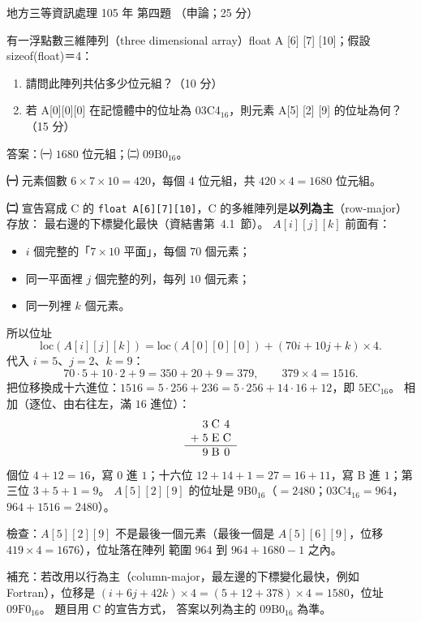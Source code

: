 \begin{pastexam}[label={px:df3-105-ds-04}]{地方三等資訊處理 105 年 第四題}
（申論；25 分）

有一浮點數三維陣列（three dimensional array）float A [6] [7] [10]；假設 sizeof(float)＝4：
\begin{enumerate}[leftmargin=2.6em, labelsep=0.4em]
\item[㈠] 請問此陣列共佔多少位元組？（10 分）
\item[㈡] 若 A[0][0][0] 在記憶體中的位址為 03C4$_{16}$，則元素 A[5] [2] [9] 的位址為何？（15 分）
\end{enumerate}
\end{pastexam}

\begin{pastsoln}
答案：㈠ $1680$ 位元組；㈡ $09\mathrm{B}0_{16}$。

\textbf{㈠} 元素個數 $6 \times 7 \times 10 = 420$，每個 $4$ 位元組，共 $420 \times 4 = 1680$ 位元組。

\textbf{㈡} 宣告寫成 C 的 \texttt{float A[6][7][10]}，C 的多維陣列是\textbf{以列為主}（row-major）存放：
最右邊的下標變化最快（資結書第~4.1~節）。 $A[i][j][k]$ 前面有：
\begin{itemize}
\item $i$ 個完整的「$7 \times 10$ 平面」，每個 $70$ 個元素；
\item 同一平面裡 $j$ 個完整的列，每列 $10$ 個元素；
\item 同一列裡 $k$ 個元素。
\end{itemize}
所以位址
\[
\mathrm{loc}(A[i][j][k]) = \mathrm{loc}(A[0][0][0]) + (70 i + 10 j + k) \times 4 .
\]
代入 $i = 5$、$j = 2$、$k = 9$：
\[
70 \cdot 5 + 10 \cdot 2 + 9 = 350 + 20 + 9 = 379, \qquad 379 \times 4 = 1516 .
\]
把位移換成十六進位：$1516 = 5 \cdot 256 + 236 = 5 \cdot 256 + 14 \cdot 16 + 12$，即 $5\mathrm{EC}_{16}$。
相加（逐位、由右往左，滿 $16$ 進位）：
\[
\begin{array}{r@{\;}c@{\;}c@{\;}c}
 & 3 & \mathrm{C} & 4 \\
+ & 5 & \mathrm{E} & \mathrm{C} \\
\hline
 & 9 & \mathrm{B} & 0
\end{array}
\]
個位 $4 + 12 = 16$，寫 $0$ 進 $1$；十六位 $12 + 14 + 1 = 27 = 16 + 11$，寫 B 進 $1$；第三位 $3 + 5 + 1 = 9$。
$A[5][2][9]$ 的位址是 $9\mathrm{B}0_{16}$（$= 2480$；$03\mathrm{C}4_{16} = 964$，$964 + 1516 = 2480$）。

檢查：$A[5][2][9]$ 不是最後一個元素（最後一個是 $A[5][6][9]$，位移 $419 \times 4 = 1676$），位址落在陣列
範圍 $964$ 到 $964 + 1680 - 1$ 之內。

補充：若改用以行為主（column-major，最左邊的下標變化最快，例如 Fortran），位移是
$(i + 6j + 42k) \times 4 = (5 + 12 + 378) \times 4 = 1580$，位址 $09\mathrm{F}0_{16}$。 題目用 C 的宣告方式，
答案以列為主的 $09\mathrm{B}0_{16}$ 為準。
\end{pastsoln}
